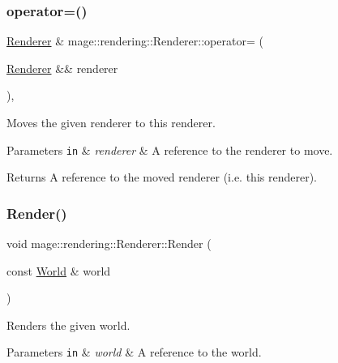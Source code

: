 \subsubsection{\texorpdfstring{operator=()}{operator=()}\hspace{0.1cm}{\footnotesize\ttfamily [2/2]}}
{\footnotesize\ttfamily \hyperlink{classmage_1_1rendering_1_1_renderer}{Renderer} \& mage\+::rendering\+::\+Renderer\+::operator= (\begin{DoxyParamCaption}\item[{\hyperlink{classmage_1_1rendering_1_1_renderer}{Renderer} \&\&}]{renderer }\end{DoxyParamCaption})\hspace{0.3cm}{\ttfamily [default]}, {\ttfamily [noexcept]}}

Moves the given renderer to this renderer.


\begin{DoxyParams}[1]{Parameters}
\mbox{\tt in}  & {\em renderer} & A reference to the renderer to move. \\
\hline
\end{DoxyParams}
\begin{DoxyReturn}{Returns}
A reference to the moved renderer (i.\+e. this renderer). 
\end{DoxyReturn}
\hypertarget{classmage_1_1rendering_1_1_renderer_aede128f4a20add4df3f101601b444902}{}\label{classmage_1_1rendering_1_1_renderer_aede128f4a20add4df3f101601b444902} 
\subsubsection{\texorpdfstring{Render()}{Render()}}
{\footnotesize\ttfamily void mage\+::rendering\+::\+Renderer\+::\+Render (\begin{DoxyParamCaption}\item[{const \hyperlink{classmage_1_1rendering_1_1_world}{World} \&}]{world }\end{DoxyParamCaption})}

Renders the given world.


\begin{DoxyParams}[1]{Parameters}
\mbox{\tt in}  & {\em world} & A reference to the world. \\
\hline
\end{DoxyParams}

